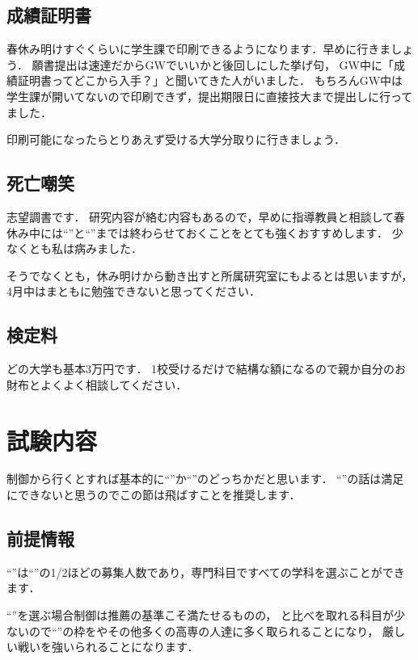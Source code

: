 \documentclass[dvipdfmx]{jsarticle}
\begin{document}
\subsection{成績証明書}
春休み明けすぐくらいに学生課で印刷できるようになります．早めに行きましょう．
願書提出は速達だからGWでいいかと後回しにした挙げ句，
GW中に「成績証明書ってどこから入手？」と聞いてきた人がいました．
もちろんGW中は学生課が開いてないので印刷できず，提出期限日に直接技大まで提出しに行ってました．

印刷可能になったらとりあえず受ける大学分取りに行きましょう．

\subsection{死亡嘲笑}
志望調書です．
研究内容が絡む内容もあるので，早めに指導教員と相談して春休み中には``''と``''までは終わらせておくことをとても強くおすすめします．
少なくとも私は病みました．

そうでなくとも，休み明けから動き出すと所属研究室にもよるとは思いますが，4月中はまともに勉強できないと思ってください．

\subsection{検定料}
どの大学も基本3万円です．
1校受けるだけで結構な額になるので親か自分のお財布とよくよく相談してください．


\section{試験内容}
制御から行くとすれば基本的に``''か``''のどっちかだと思います．
``''の話は満足にできないと思うのでこの節は飛ばすことを推奨します．
\subsection{前提情報}
``''は``''の1/2ほどの募集人数であり，専門科目ですべての学科を選ぶことができます．

``''を選ぶ場合制御は推薦の基準こそ満たせるものの，
と比べを取れる科目が少ないので``''の枠をやその他多くの高専の人達に多く取られることになり，
厳しい戦いを強いられることになります．
\end{document}
